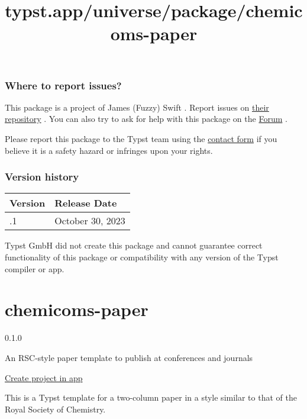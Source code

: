\subsubsection{Where to report issues?}\label{where-to-report-issues}

This package is a project of James (Fuzzy) Swift . Report issues on
\href{https://github.com/JamesxX/typst-chem-par}{their repository} . You
can also try to ask for help with this package on the
\href{https://forum.typst.app}{Forum} .

Please report this package to the Typst team using the
\href{https://typst.app/contact}{contact form} if you believe it is a
safety hazard or infringes upon your rights.

\label{versions}
\subsubsection{Version history}\label{version-history}

\begin{longtable}[]{@{}ll@{}}
\toprule\noalign{}
Version & Release Date \\
\midrule\noalign{}
\endhead
\bottomrule\noalign{}
\endlastfoot
0.0.1 & October 30, 2023 \\
\end{longtable}

Typst GmbH did not create this package and cannot guarantee correct
functionality of this package or compatibility with any version of the
Typst compiler or app.


\title{typst.app/universe/package/chemicoms-paper}

\label{banner}
\label{template-thumbnail}

\section{chemicoms-paper}\label{chemicoms-paper}

{ 0.1.0 }

An RSC-style paper template to publish at conferences and journals

\href{/app?template=chemicoms-paper&version=0.1.0}{Create project in
app}

\label{readme}
This is a Typst template for a two-column paper in a style similar to
that of the Royal Society of Chemistry.

